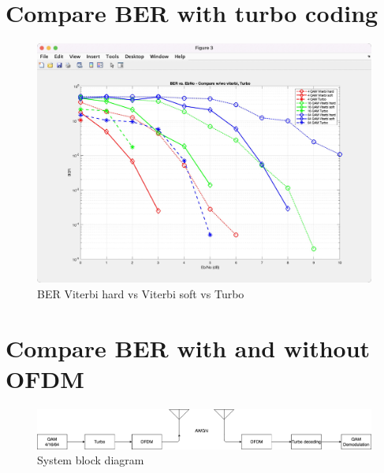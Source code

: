 \documentclass[12pt]{article}
\begin{document}
\section{Compare BER with turbo coding}


\begin{figure}[ht]
    \includegraphics[width=\textwidth]{turbo}
    \caption{BER Viterbi hard vs Viterbi soft vs Turbo}
\end{figure}

\section{Compare BER with and without OFDM}
\begin{figure}[ht]
    \includegraphics[width=\textwidth]{systemblock}
    \caption{System block diagram}
\end{figure}





\end{document}
